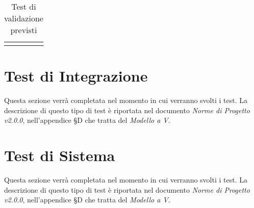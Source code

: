 \begin{longtable}{|m{}|m{}|m{}|m{}|}
\hline
\caption{Test di validazione previsti}
\label{testvalidazioneprevisti}
\end{longtable}




\newpage
\section{Test di Integrazione}
\label{test_i}
Questa sezione verrà completata nel momento in cui verranno svolti i test. La descrizione di questo tipo di test è riportata nel documento \textit{Norme di Progetto v2.0.0}, nell'appendice §D che tratta del \textit{Modello a V}.

\newpage
\section{Test di Sistema}
\label{test_s}
Questa sezione verrà completata nel momento in cui verranno svolti i test. La descrizione di questo tipo di test è riportata nel documento \textit{Norme di Progetto v2.0.0}, nell'appendice §D che tratta del \textit{Modello a V}.
\newpage